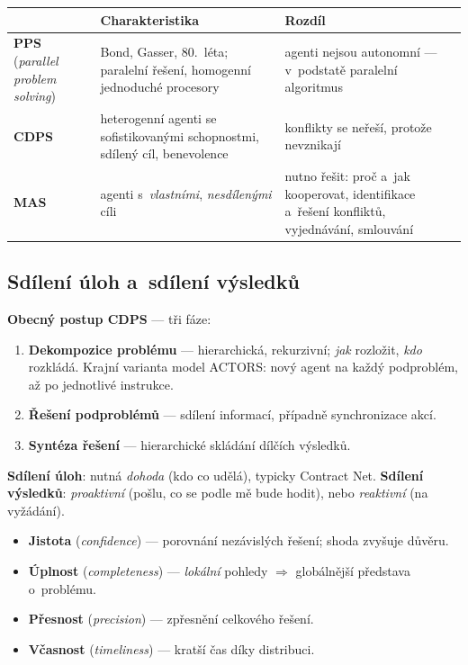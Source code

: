 \documentclass[11pt,a4paper]{article}
\theoremstyle{definition}
\begin{document}
\begin{center}\small
\begin{tabular}{p{} p{} p{}}
\toprule
& \textbf{Charakteristika} & \textbf{Rozdíl} \\
\midrule
\textbf{PPS} \newline (\emph{parallel problem solving})
  & Bond, Gasser, 80.~léta; paralelní řešení, homogenní jednoduché procesory
  & agenti nejsou autonomní --- v~podstatě paralelní algoritmus \\
\textbf{CDPS}
  & heterogenní agenti se sofistikovanými schopnostmi, sdílený cíl, benevolence
  & konflikty se neřeší, protože nevznikají \\
\textbf{MAS}
  & agenti s~\emph{vlastními}, \emph{nesdílenými} cíli
  & nutno řešit: proč a~jak kooperovat, identifikace a~řešení konfliktů, vyjednávání,
    smlouvání \\
\bottomrule
\end{tabular}
\end{center}

\subsection{Sdílení úloh a~sdílení výsledků}

\textbf{Obecný postup CDPS} --- tři fáze:
\begin{enumerate}
\item \textbf{Dekompozice problému} --- hierarchická, rekurzivní; \emph{jak} rozložit,
  \emph{kdo} rozkládá. Krajní varianta model ACTORS: nový agent na každý podproblém, až
  po jednotlivé instrukce.
\item \textbf{Řešení podproblémů} --- sdílení informací, případně synchronizace akcí.
\item \textbf{Syntéza řešení} --- hierarchické skládání dílčích výsledků.
\end{enumerate}

\textbf{Sdílení úloh}: nutná \emph{dohoda} (kdo co udělá), typicky Contract Net.
\textbf{Sdílení výsledků}: \emph{proaktivní} (pošlu, co se podle mě bude hodit), nebo
\emph{reaktivní} (na vyžádání).

\begin{defbox}
\begin{itemize}
\item \textbf{Jistota} (\emph{confidence}) --- porovnání nezávislých řešení; shoda zvyšuje
  důvěru.
\item \textbf{Úplnost} (\emph{completeness}) --- \emph{lokální} pohledy $\Rightarrow$
  globálnější představa o~problému.
\item \textbf{Přesnost} (\emph{precision}) --- zpřesnění celkového řešení.
\item \textbf{Včasnost} (\emph{timeliness}) --- kratší čas díky distribuci.
\end{itemize}
\end{defbox}
\end{document}
